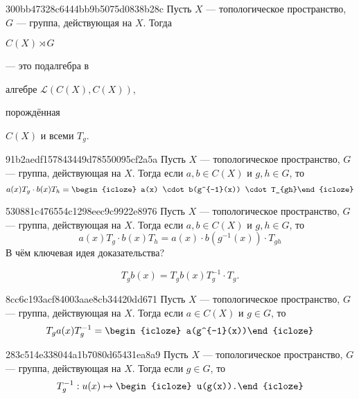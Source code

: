 \begin{note}{300bb47328c6444bb9b5075d0838b28c}
    Пусть \({ X }\) --- топологическое пространство, \({ G }\) --- группа, действующая на \({ X }\).
    Тогда \begin{icloze}{3}\({ C(X) \rtimes G }\)\end{icloze} --- это подалгебра в \begin{icloze}{2}алгебре \({ \mathcal L(C(X), C(X)) }\),\end{icloze} порождённая \begin{icloze}{1}\({ C(X) }\) и всеми \({ T_{g} }\).\end{icloze}
\end{note}

\begin{note}{91b2aedf157843449d78550095cf2a5a}
    Пусть \({ X }\) --- топологическое пространство, \({ G }\) --- группа, действующая на \({ X }\).
    Тогда если \({ a, b \in C(X) }\) и \({ g, h \in G }\), то
    \[
        a(x)T_{g} \cdot b(x) T_{h} = \begin{icloze}{1}a(x) \cdot b(g^{-1}(x)) \cdot T_{gh}\end{icloze}
    \]
\end{note}

\begin{note}{530881c476554c1298eec9c9922e8976}
    Пусть \({ X }\) --- топологическое пространство, \({ G }\) --- группа, действующая на \({ X }\).
    Тогда если \({ a, b \in C(X) }\) и \({ g, h \in G }\), то
    \[
        a(x)T_{g} \cdot b(x) T_{h} = a(x) \cdot b(g^{-1}(x)) \cdot T_{gh}
    \]
    В чём ключевая идея доказательства?

    \begin{cloze}{1}
        \[
            T_{g} b(x) = T_{g} b(x) T_{g}^{-1} \cdot T_{g}.
        \]
    \end{cloze}
\end{note}

\begin{note}{8cc6c193acf84003aae8cb34420dd671}
    Пусть \({ X }\) --- топологическое пространство, \({ G }\) --- группа, действующая на \({ X }\).
    Тогда если \({ a \in C(X) }\) и \({ g \in G }\), то
    \[
        T_{g} a(x) T_{g}^{-1} = \begin{icloze}{1}a(g^{-1}(x))\end{icloze}
    \]
\end{note}

\begin{note}{283c514e338044a1b7080d65431ea8a9}
    Пусть \({ X }\) --- топологическое пространство, \({ G }\) --- группа, действующая на \({ X }\).
    Тогда если \({ g \in G }\), то
    \[
        T_{g}^{-1} : u(x) \mapsto \begin{icloze}{1}u(g(x)).\end{icloze}
    \]
\end{note}

